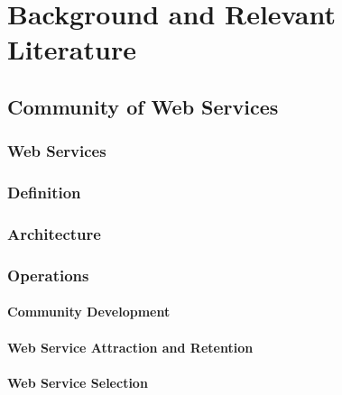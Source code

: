 \setcounter{chapter}{1}

\chapter{Background and Relevant Literature}\label{sec:MAS}



    \section{Community of Web Services}\label{sec:CommunityWS}


        \subsection{Web Services}\label{sec:BRWS}


        \subsection{Definition}\label{sec:CWSDefinition}

        \subsection{Architecture}\label{sec:CWSArchitecture}

        \subsection{Operations}\label{sec:CWSOperations}

            \subsubsection{Community Development}\label{sec:CWSCommunityDev}

            \subsubsection{Web Service Attraction and Retention}\label{sec:CWSAttraction}

            \subsubsection{Web Service Selection}\label{sec:CWSSelection}
            

